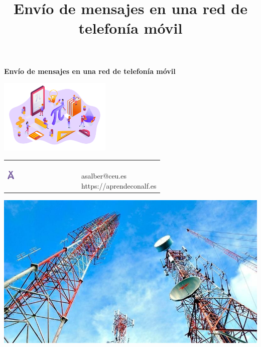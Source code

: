 \documentclass[
  a4paper,
]{scrreport}
\title{Envío de mensajes en una red de telefonía móvil}
\author{}
\date{}
\begin{document}
\begin{titlepage}

\begin{center}
\vspace*{5cm}

\Huge
{\textbf{\textsf{Envío de mensajes en una red de telefonía móvil}}}

\vspace{0.5cm}
\LARGE
{\textbf{\textsf{}}}

\vspace{1.5cm}

\includegraphics[width=0.4\textwidth]{../img/logos/proyectos.png}
\end{center}

\vfill

\begin{flushleft}
\begin{tabular}{ll}
\includegraphics[width=0.1\textwidth]{../img/logos/aprendeconalf.png} & \parbox[b]{5cm}{\Large\textsf{}\\ \textsf{asalber@ceu.es} \\ \textsf{https://aprendeconalf.es}}
\end{tabular}
\end{flushleft}
\end{titlepage}\ifdefined\Shaded\renewenvironment{Shaded}{\begin{tcolorbox}[borderline west={3pt}{0pt}{shadecolor}, interior hidden, boxrule=0pt, sharp corners, frame hidden, enhanced, breakable]}{\end{tcolorbox}}\fi

\includegraphics{../img/telefonia-movil/antenas.jpg}
\end{document}
